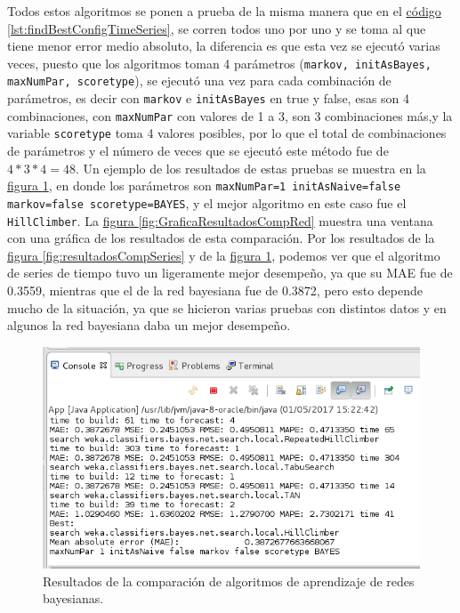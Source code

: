 Todos estos algoritmos se ponen a prueba de la misma manera que en el 
\hyperref[lst:findBestConfigTimeSeries]{código \ref{lst:findBestConfigTimeSeries}}, se corren todos uno por uno y se toma al que tiene menor error medio absoluto, la diferencia es que esta vez se ejecutó varias veces, puesto que los algoritmos toman 4 parámetros (\texttt{markov, initAsBayes, maxNumPar, scoretype}), se ejecutó una vez para cada combinación de parámetros, es decir con \texttt{markov} e \texttt{initAsBayes} en true y false, esas son 4 combinaciones, con \texttt{maxNumPar} con valores de 1 a 3, son 3 combinaciones más,y la variable \texttt{scoretype} toma 4 valores posibles, por lo que el total de combinaciones de parámetros y el número de veces que se ejecutó este método fue de $4*3*4 = 48$. 
Un ejemplo de los resultados de estas pruebas se muestra en la 
\hyperref[fig:resultadosComparacionRed]{figura \ref{fig:resultadosComparacionRed}}, en donde los parámetros son \texttt{maxNumPar=1 initAsNaive=false markov=false scoretype=BAYES}, y el mejor algoritmo en este caso fue el \texttt{HillClimber}. 
La \hyperref[fig:GraficaResultadosCompRed]{ figura \ref{fig:GraficaResultadosCompRed}} muestra una ventana con una gráfica de los resultados de esta comparación. 
Por los resultados de la 
\hyperref[fig:resultadosCompSeries]{ figura \ref{fig:resultadosCompSeries}} y de la
\hyperref[fig:resultadosComparacionRed]{figura \ref{fig:resultadosComparacionRed}}, podemos ver que el algoritmo de series de tiempo tuvo un ligeramente mejor desempeño, ya que su MAE fue de 0.3559, mientras que el de la red bayesiana fue de 0.3872, pero esto depende mucho de la situación, ya que se hicieron varias pruebas con distintos datos y en algunos la red bayesiana daba un mejor desempeño.


\begin{figure}[ht]
	\centering
	\includegraphics[width=15cm]{img/resultadosComparacionRed.png}
	\caption{Resultados de la comparación de algoritmos de aprendizaje de redes bayesianas.}
	\label{fig:resultadosComparacionRed}
\end{figure}

